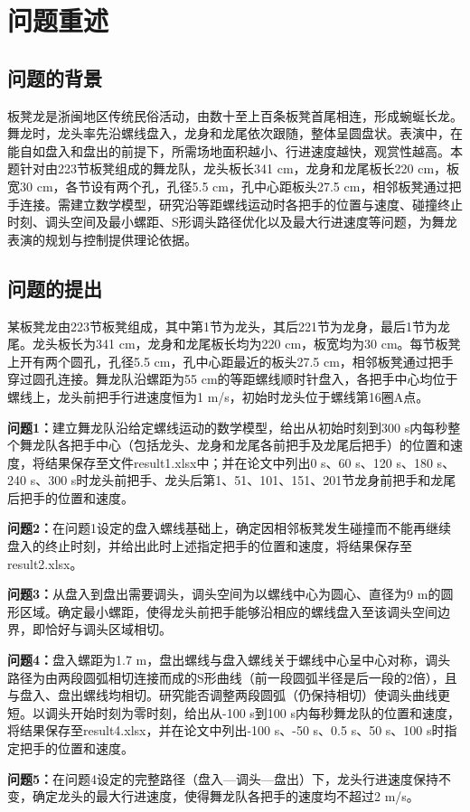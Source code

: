 
\section{问题重述}

\subsection{问题的背景}
板凳龙是浙闽地区传统民俗活动，由数十至上百条板凳首尾相连，形成蜿蜒长龙。舞龙时，龙头率先沿螺线盘入，龙身和龙尾依次跟随，整体呈圆盘状。表演中，在能自如盘入和盘出的前提下，所需场地面积越小、行进速度越快，观赏性越高。本题针对由223节板凳组成的舞龙队，龙头板长341 cm，龙身和龙尾板长220 cm，板宽30 cm，各节设有两个孔，孔径5.5 cm，孔中心距板头27.5 cm，相邻板凳通过把手连接。需建立数学模型，研究沿等距螺线运动时各把手的位置与速度、碰撞终止时刻、调头空间及最小螺距、S形调头路径优化以及最大行进速度等问题，为舞龙表演的规划与控制提供理论依据。

\subsection{问题的提出}
某板凳龙由223节板凳组成，其中第1节为龙头，其后221节为龙身，最后1节为龙尾。龙头板长为341 cm，龙身和龙尾板长均为220 cm，板宽均为30 cm。每节板凳上开有两个圆孔，孔径5.5 cm，孔中心距最近的板头27.5 cm，相邻板凳通过把手穿过圆孔连接。舞龙队沿螺距为55 cm的等距螺线顺时针盘入，各把手中心均位于螺线上，龙头前把手行进速度恒为1 m/s，初始时龙头位于螺线第16圈A点。

\textbf{问题1：}建立舞龙队沿给定螺线运动的数学模型，给出从初始时刻到300 s内每秒整个舞龙队各把手中心（包括龙头、龙身和龙尾各前把手及龙尾后把手）的位置和速度，将结果保存至文件result1.xlsx中；并在论文中列出0 s、60 s、120 s、180 s、240 s、300 s时龙头前把手、龙头后第1、51、101、151、201节龙身前把手和龙尾后把手的位置和速度。

\textbf{问题2：}在问题1设定的盘入螺线基础上，确定因相邻板凳发生碰撞而不能再继续盘入的终止时刻，并给出此时上述指定把手的位置和速度，将结果保存至result2.xlsx。

\textbf{问题3：}从盘入到盘出需要调头，调头空间为以螺线中心为圆心、直径为9 m的圆形区域。确定最小螺距，使得龙头前把手能够沿相应的螺线盘入至该调头空间边界，即恰好与调头区域相切。

\textbf{问题4：}盘入螺距为1.7 m，盘出螺线与盘入螺线关于螺线中心呈中心对称，调头路径为由两段圆弧相切连接而成的S形曲线（前一段圆弧半径是后一段的2倍），且与盘入、盘出螺线均相切。研究能否调整两段圆弧（仍保持相切）使调头曲线更短。以调头开始时刻为零时刻，给出从-100 s到100 s内每秒舞龙队的位置和速度，将结果保存至result4.xlsx，并在论文中列出-100 s、-50 s、0.5 s、50 s、100 s时指定把手的位置和速度。

\textbf{问题5：}在问题4设定的完整路径（盘入—调头—盘出）下，龙头行进速度保持不变，确定龙头的最大行进速度，使得舞龙队各把手的速度均不超过2 m/s。

